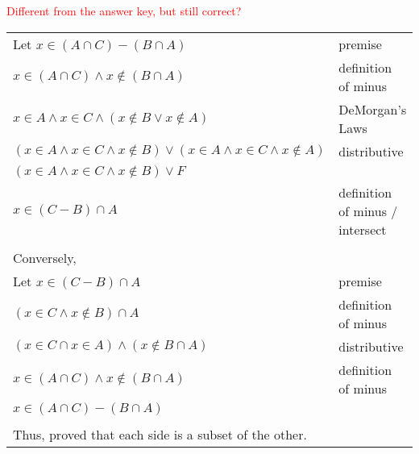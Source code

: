 \documentclass[12pt]{exam}
\begin{document}
\begin{solution}
	\textcolor{red}{Different from the answer key, but still correct?}\\
	\begin{tabular}{ll}
		Let $x\in (A \cap C) - (B \cap A)$                                                 & premise                         \\
		$x\in (A \cap C) \land x\notin (B \cap A)$                                         & definition of minus             \\
		$x\in A \land x\in C \land (x\notin B \lor x\notin A)$                             & DeMorgan's Laws                 \\
		$(x\in A \land x\in C \land x\notin B) \lor (x\in A \land x\in C \land x\notin A)$ & distributive                    \\
		$(x\in A \land x\in C \land x\notin B) \lor F$                                     &                                 \\
		$x\in (C-B)\cap A$                                                                 & definition of minus / intersect \\

		\\Conversely,\\
		Let $x\in (C-B)\cap A$                                                             & premise                         \\
		$(x\in C \land x\notin B)\cap A$                                                   & definition of minus             \\
		$(x\in C \cap x \in A) \land (x\notin B \cap A) $                                  & distributive                    \\
		$x\in (A \cap C) \land x\notin (B \cap A)$                                         & definition of minus             \\
		$x\in (A \cap C) - (B \cap A)$                                                                                       \\


		\\Thus, proved that each side is a subset of the other.
	\end{tabular}
\end{solution}
\end{document}
